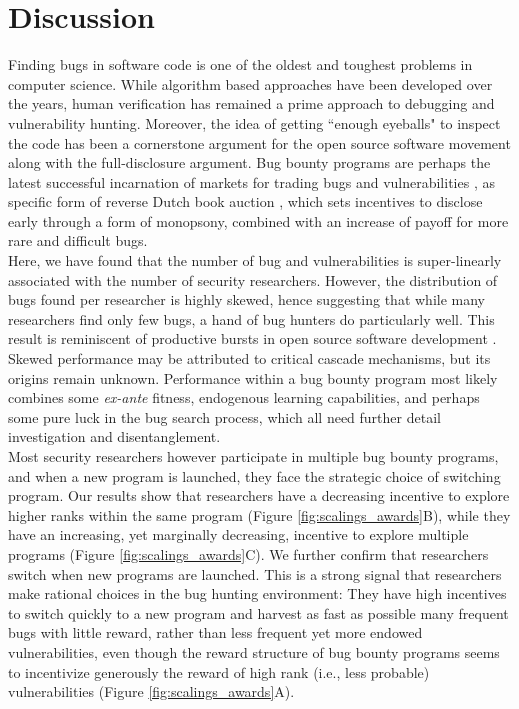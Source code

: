 \section{Discussion}
\label{sec:discussion}
Finding bugs in software code is one of the oldest and toughest problems in computer science. While algorithm based approaches have been developed over the years, human verification has remained a prime approach to debugging and vulnerability hunting. Moreover, the idea of getting ``enough eyeballs" to inspect the code has been a cornerstone argument for the open source software movement \cite{raymond1999cathedral} along with the full-disclosure argument. Bug bounty programs are perhaps the latest successful incarnation of markets for trading bugs and vulnerabilities \cite{bohme2006comparison}, as specific form of reverse Dutch book auction \cite{ozment2004bug}, which sets incentives to disclose early through a form of monopsony, combined with an increase of payoff for more rare and difficult bugs.\\

Here, we have found that the number of bug and vulnerabilities is super-linearly associated with the number of security researchers. However, the distribution of bugs found per researcher is highly skewed, hence suggesting that while many researchers find only few bugs, a hand of bug hunters do particularly well. This result is reminiscent of productive bursts in open source software development \cite{sornette2014much}. Skewed performance may be attributed to critical cascade mechanisms, but its origins remain unknown. Performance within a bug bounty program most likely combines some {\it ex-ante} fitness, endogenous learning capabilities, and perhaps some pure luck in the bug search process, which all need further detail investigation and disentanglement.\\

Most security researchers however participate in multiple bug bounty programs, and when a new program is launched, they face the strategic choice of switching program. Our results show that researchers have a decreasing incentive to explore higher ranks within the same program (Figure \ref{fig:scalings_awards}B), while they have an increasing, yet marginally decreasing, incentive to explore multiple programs (Figure \ref{fig:scalings_awards}C). We further confirm that researchers switch when new programs are launched. This is a strong signal that researchers make rational choices in the bug hunting environment: They have high incentives to switch quickly to a new program and harvest as fast as possible many frequent bugs with little reward, rather than less frequent yet more endowed vulnerabilities, even though the reward structure of bug bounty programs seems to incentivize generously the reward of high rank (i.e., less probable) vulnerabilities (Figure \ref{fig:scalings_awards}A).\\

